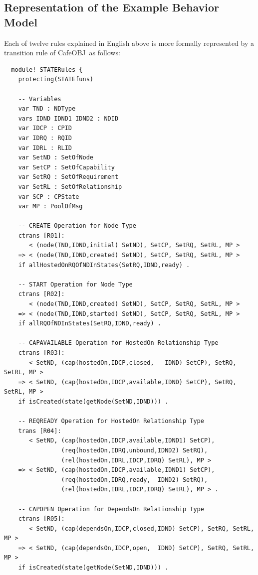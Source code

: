\documentclass[12pt]{report}
\newcommand{\cafeobj}{{\sf CafeOBJ}~}
\begin{document}
\subsection{Representation of the Example Behavior Model}
Each of twelve rules explained in English above is more formally
represented by a transition rule of \cafeobj as follows:
\small
\begin{verbatim}
  module! STATERules {
    protecting(STATEfuns)
  
    -- Variables
    var TND : NDType
    vars IDND IDND1 IDND2 : NDID 
    var IDCP : CPID
    var IDRQ : RQID
    var IDRL : RLID
    var SetND : SetOfNode
    var SetCP : SetOfCapability
    var SetRQ : SetOfRequirement
    var SetRL : SetOfRelationship
    var SCP : CPState
    var MP : PoolOfMsg
  
    -- CREATE Operation for Node Type
    ctrans [R01]:
       < (node(TND,IDND,initial) SetND), SetCP, SetRQ, SetRL, MP >
    => < (node(TND,IDND,created) SetND), SetCP, SetRQ, SetRL, MP > 
    if allHostedOnRQOfNDInStates(SetRQ,IDND,ready) .
  
    -- START Operation for Node Type
    ctrans [R02]:
       < (node(TND,IDND,created) SetND), SetCP, SetRQ, SetRL, MP >
    => < (node(TND,IDND,started) SetND), SetCP, SetRQ, SetRL, MP > 
    if allRQOfNDInStates(SetRQ,IDND,ready) .
  
    -- CAPAVAILABLE Operation for HostedOn Relationship Type
    ctrans [R03]:
       < SetND, (cap(hostedOn,IDCP,closed,   IDND) SetCP), SetRQ, SetRL, MP >
    => < SetND, (cap(hostedOn,IDCP,available,IDND) SetCP), SetRQ, SetRL, MP >
    if isCreated(state(getNode(SetND,IDND))) .
  
    -- REQREADY Operation for HostedOn Relationship Type
    trans [R04]:
       < SetND, (cap(hostedOn,IDCP,available,IDND1) SetCP), 
                (req(hostedOn,IDRQ,unbound,IDND2) SetRQ),
                (rel(hostedOn,IDRL,IDCP,IDRQ) SetRL), MP >
    => < SetND, (cap(hostedOn,IDCP,available,IDND1) SetCP), 
                (req(hostedOn,IDRQ,ready,  IDND2) SetRQ),
                (rel(hostedOn,IDRL,IDCP,IDRQ) SetRL), MP > .
  
    -- CAPOPEN Operation for DependsOn Relationship Type
    ctrans [R05]:
       < SetND, (cap(dependsOn,IDCP,closed,IDND) SetCP), SetRQ, SetRL, MP >
    => < SetND, (cap(dependsOn,IDCP,open,  IDND) SetCP), SetRQ, SetRL, MP >
    if isCreated(state(getNode(SetND,IDND))) .
  

\end{verbatim}
\end{document}
